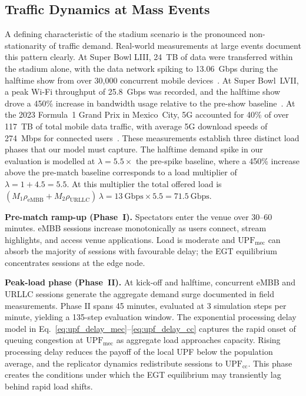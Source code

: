 \documentclass[conference]{IEEEtran}
\begin{document}
\subsection{Traffic Dynamics at Mass Events}
\label{sec:traffic}

A defining characteristic of the stadium scenario is the
pronounced non-stationarity of traffic demand. Real-world
measurements at large events document this pattern
clearly. At Super Bowl LIII, 24~TB of data were
transferred within the stadium alone, with the data
network spiking to 13.06~Gbps during the halftime show
from over 30,000 concurrent mobile
devices~\cite{nokia_live_events}. At Super Bowl~LVII,
a peak Wi-Fi throughput of 25.8~Gbps was recorded,
and the halftime show drove a 450\% increase in
bandwidth usage relative to the pre-show
baseline~\cite{superbowl_lvii}. At the 2023 Formula~1
Grand Prix in Mexico~City, 5G accounted for 40\% of
over 117~TB of total mobile data traffic, with average
5G download speeds of 274~Mbps for connected
users~\cite{ericsson_f1_2023}. These measurements
establish three distinct load phases that our model
must capture. The halftime demand spike in our
evaluation is modelled at $\lambda = 5.5\times$ the
pre-spike baseline, where a 450\% increase above the 
pre-match baseline corresponds to a load multiplier 
of $\lambda = 1 + 4.5 = 5.5$.
At this multiplier the total offered load is
$(M_1\rho_\text{eMBB} + M_2\rho_\text{URLLC})\,\lambda
= 13~\text{Gbps} \times 5.5 = 71.5~\text{Gbps}$.

\textbf{Pre-match ramp-up (Phase~I).} Spectators enter
the venue over 30--60 minutes. eMBB sessions increase
monotonically as users connect, stream highlights, and
access venue applications. Load is moderate and
$\text{UPF}_\text{mec}$ can absorb the majority of
sessions with favourable delay; the EGT equilibrium
concentrates sessions at the edge node.

\textbf{Peak-load phase (Phase~II).} At kick-off and
halftime, concurrent eMBB and URLLC sessions generate
the aggregate demand surge documented in field
measurements. Phase II spans 45 minutes, evaluated at 
3 simulation steps per minute, yielding a 135-step 
evaluation window. The exponential processing delay model in
Eq.~\eqref{eq:upf_delay_mec}--\eqref{eq:upf_delay_cc}
captures the rapid onset of queuing congestion at
$\text{UPF}_\text{mec}$ as aggregate load approaches
capacity. Rising processing delay reduces the payoff of
the local UPF below the population average, and the
replicator dynamics redistribute sessions to
$\text{UPF}_\text{cc}$. This phase creates the
conditions under which the EGT equilibrium may
transiently lag behind rapid load shifts.
\end{document}
